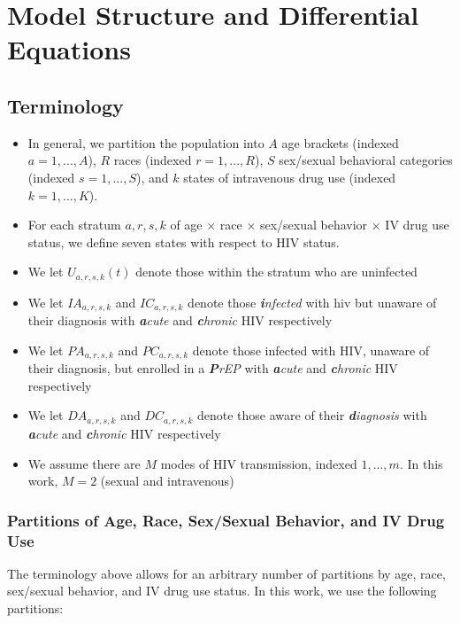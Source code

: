 \documentclass{article}
\begin{document}
\section{Model Structure and Differential Equations}\label{model}




\subsection{Terminology}

\begin{itemize}
	\item In general, we partition the population into $A$ age brackets (indexed $a = 1, ..., A$), $R$ races (indexed $r = 1, ..., R$), $S$ sex/sexual behavioral categories (indexed $s = 1, ..., S$), and $k$ states of intravenous drug use (indexed $k = 1, ..., K$).
	\item For each stratum $a,r,s,k$ of age $\times$ race $\times$ sex/sexual behavior $\times$ IV drug use status, we define seven states with respect to HIV status.
	\item We let $U_{a,r,s,k}(t)$ denote those within the stratum who are uninfected
	\item We let $IA_{a,r,s,k}$ and $IC_{a,r,s,k}$ denote those \textit{\textbf{i}nfected} with hiv but unaware of their diagnosis with \textit{\textbf{a}cute} and \textit{\textbf{c}hronic} HIV respectively
	\item We let $PA_{a,r,s,k}$ and $PC_{a,r,s,k}$ denote those infected with HIV, unaware of their diagnosis, but enrolled in a \textit{\textbf{P}rEP} with \textit{\textbf{a}cute} and \textit{\textbf{c}hronic} HIV respectively
	\item We let $DA_{a,r,s,k}$ and $DC_{a,r,s,k}$ denote those aware of their \textit{\textbf{d}iagnosis} with \textit{\textbf{a}cute} and \textit{\textbf{c}hronic} HIV respectively
	\item We assume there are $M$ modes of HIV transmission, indexed $1, ..., m$. In this work, $M=2$ (sexual and intravenous)
\end{itemize}

\subsubsection{Partitions of Age, Race, Sex/Sexual Behavior, and IV Drug Use}
The terminology above allows for an arbitrary number of partitions by age, race, sex/sexual behavior, and IV drug use status. In this work, we use the following partitions:
\end{document}
